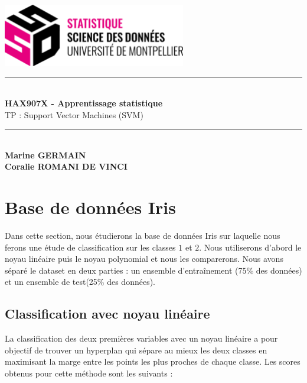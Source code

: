 \documentclass[a4paper,12pt]{article}
\begin{document}
\begin{titlepage}

    \vspace*{4cm}

    \centering
    
    \includegraphics[width=0.6\textwidth]{Images/logo.png} \\[1.5cm]
    
    \rule{\linewidth}{1pt} \\[1cm]

    {\Huge \bfseries HAX907X - Apprentissage statistique}\\[0.5cm]
    {\Huge TP : Support Vector Machines (SVM)}\\[1cm]
    
    \rule{\linewidth}{1pt} \\[2cm]

    {\Large \textbf{Marine GERMAIN}}\\
    {\Large \textbf{Coralie ROMANI DE VINCI}}\\[1cm]
    

\end{titlepage}


\renewcommand{\contentsname}{Table des matières}
\tableofcontents


\newpage

\section{Base de données Iris}

Dans cette section, nous étudierons la base de données Iris sur laquelle nous ferons une étude de classification sur les classes $1$ et $2$.
Nous utiliserons d'abord le noyau linéaire puis le noyau polynomial et nous les comparerons.
Nous avons séparé le dataset en deux parties : un ensemble d'entraînement (75\% des données) et un ensemble de test(25\% des données). 

\subsection{Classification avec noyau linéaire}

La classification des deux premières variables avec un noyau linéaire a pour objectif de trouver un hyperplan qui sépare au mieux les deux classes en maximisant la marge entre les points les plus proches de chaque classe. 
Les scores obtenus pour cette méthode sont les suivants :
\end{document}
